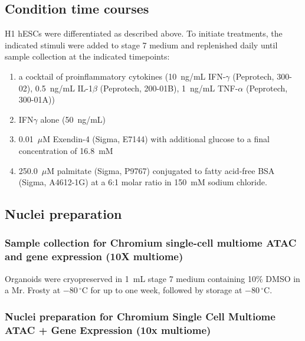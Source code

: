 \subsection{Condition time courses}

H1 hESCs were differentiated as described above. To initiate treatments, the indicated stimuli were added to stage 7 medium and replenished daily until sample collection at the indicated timepoints:

\begin{enumerate}
    \item a cocktail of proinflammatory cytokines (10~ng/mL IFN-\ensuremath{\gamma} (Peprotech, 300-02), 0.5~ng/mL IL-1\ensuremath{\beta} (Peprotech, 200-01B), 1~ng/mL TNF-\ensuremath{\alpha} (Peprotech, 300-01A))
    \item IFN\ensuremath{\gamma} alone (50~ng/mL)
    \item 0.01~\ensuremath{\mu}M Exendin-4 (Sigma, E7144) with additional glucose to a final concentration of 16.8~mM
    \item 250.0~\ensuremath{\mu}M palmitate (Sigma, P9767) conjugated to fatty acid-free BSA (Sigma, A4612-1G) at a 6:1 molar ratio in 150~mM sodium chloride.
\end{enumerate}

\subsection{Nuclei preparation}

\subsubsection{Sample collection for Chromium single-cell multiome ATAC and gene expression (10X multiome)}

Organoids were cryopreserved in 1~mL stage 7 medium containing 10\% DMSO in a Mr. Frosty at $-80\,^{\circ}\mathrm{C}$ for up to one week, followed by storage at $-80\,^{\circ}\mathrm{C}$.

\subsubsection{Nuclei preparation for Chromium Single Cell Multiome ATAC + Gene Expression (10x multiome)}

